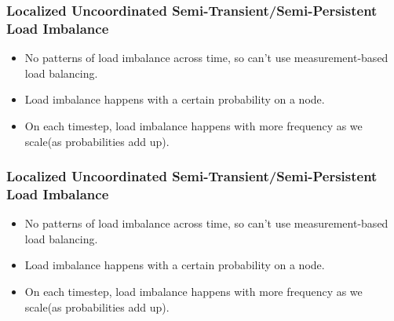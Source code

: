 

\begin{frame} 
\frametitle{Localized Uncoordinated Semi-Transient/Semi-Persistent Load Imbalance}
\begin{itemize}
\item \small No patterns of load imbalance across time, so can't use measurement-based load balancing.
\item \small Load imbalance happens with a certain probability on a node.
\item \small On each timestep, load imbalance happens with more frequency as we scale(as probabilities add up).
\end{itemize}
\end{frame}


\begin{frame} 
\frametitle{Localized Uncoordinated Semi-Transient/Semi-Persistent Load Imbalance}
\begin{itemize}
\item \small No patterns of load imbalance across time, so can't use measurement-based load balancing.
\item \small Load imbalance happens with a certain probability on a node.
\item \small On each timestep, load imbalance happens with more frequency as we scale(as probabilities add up).
\end{itemize}
\end{frame}

